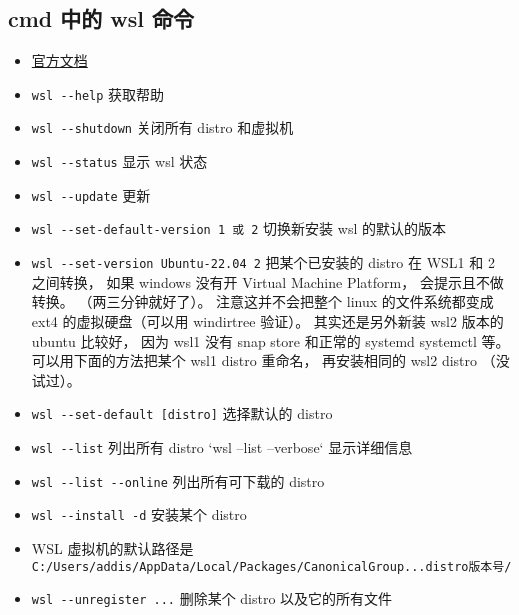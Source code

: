 
\begin{issues}
\issueDraft
\end{issues}

\subsection{cmd 中的 wsl 命令}
\begin{itemize}
\item \href{https://docs.microsoft.com/en-us/windows/wsl/}{官方文档}
\item \verb`wsl --help` 获取帮助
\item \verb`wsl --shutdown` 关闭所有 distro 和虚拟机
\item \verb`wsl --status` 显示 wsl 状态
\item \verb`wsl --update` 更新
\item \verb`wsl --set-default-version 1 或 2` 切换新安装 wsl 的默认的版本
\item \verb`wsl --set-version Ubuntu-22.04 2` 把某个已安装的 distro 在 WSL1 和 2 之间转换， 如果 windows 没有开 Virtual Machine Platform， 会提示且不做转换。 （两三分钟就好了）。 注意这并不会把整个 linux 的文件系统都变成 ext4 的虚拟硬盘（可以用 windirtree 验证）。 其实还是另外新装 wsl2 版本的 ubuntu 比较好， 因为 wsl1 没有 snap store 和正常的 systemd systemctl 等。 可以用下面的方法把某个 wsl1 distro 重命名， 再安装相同的 wsl2 distro （没试过）。
\item \verb`wsl --set-default [distro]` 选择默认的 distro
\item \verb`wsl --list` 列出所有 distro `wsl --list --verbose` 显示详细信息
\item \verb`wsl --list --online` 列出所有可下载的 distro
\item \verb`wsl --install -d` 安装某个 distro
\item WSL 虚拟机的默认路径是 \verb`C:/Users/addis/AppData/Local/Packages/CanonicalGroup...distro版本号/`
\item \verb`wsl --unregister ...` 删除某个 distro 以及它的所有文件


\end{itemize}
